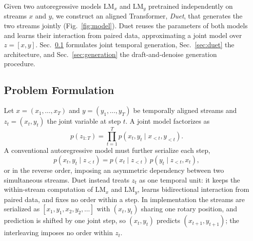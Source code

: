 
Given two autoregressive models $\mathrm{LM}_x$ and $\mathrm{LM}_y$
pretrained independently on streams $x$ and $y$, we construct an aligned
Transformer, \emph{Duet}, that generates the two streams jointly
(Fig.~\ref{fig:model}). Duet reuses the parameters of both models and
learns their interaction from paired data, approximating a joint model
over $z=[x,y]$. Sec.~\ref{sec:formulation} formulates joint temporal
generation, Sec.~\ref{sec:duet} the architecture, and
Sec.~\ref{sec:generation} the draft-and-denoise generation procedure.

\subsection{Problem Formulation}
\label{sec:formulation}

Let $x=(x_1,\ldots,x_T)$ and $y=(y_1,\ldots,y_T)$ be temporally aligned
streams and $z_t=(x_t,y_t)$ the joint variable at step $t$. A joint
model factorizes as
\begin{equation}
    p(z_{1:T})
    =
    \prod_{t=1}^{T} p(x_t,y_t \mid x_{<t},y_{<t}).
    \label{eq:joint_ar}
\end{equation}
A conventional autoregressive model must further serialize each step,
\begin{equation}
    p(x_t,y_t \mid z_{<t})
    =
    p(x_t \mid z_{<t})\,
    p(y_t \mid z_{<t},x_t),
    \label{eq:ordered_factorization}
\end{equation}
or in the reverse order, imposing an asymmetric dependency between two
simultaneous streams. Duet instead treats $z_t$ as one temporal unit:
it keeps the within-stream computation of $\mathrm{LM}_x$ and
$\mathrm{LM}_y$, learns bidirectional interaction from paired data, and
fixes no order within a step. In implementation the streams are
serialized as $[x_1,y_1,x_2,y_2,\ldots]$ with $(x_t,y_t)$ sharing one
rotary position, and prediction is shifted by one joint step, so
$(x_t,y_t)$ predicts $(x_{t+1},y_{t+1})$; the interleaving imposes no
order within $z_t$.

